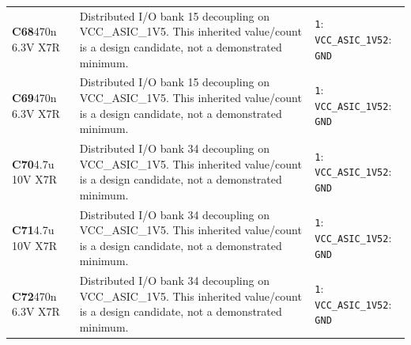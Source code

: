 \documentclass[11pt,a4paper]{article}
\begin{document}
\begin{longtable}{@{}P{27mm}P{84mm}P{57mm}@{}}
\textbf{C68}\newline 470n 6.3V X7R & Distributed I/O bank 15 decoupling on VCC\_ASIC\_1V5. This inherited value/count is a design candidate, not a demonstrated minimum. & \nolinkurl{1}: \nolinkurl{VCC_ASIC_1V5}\newline \nolinkurl{2}: \nolinkurl{GND} \\
\textbf{C69}\newline 470n 6.3V X7R & Distributed I/O bank 15 decoupling on VCC\_ASIC\_1V5. This inherited value/count is a design candidate, not a demonstrated minimum. & \nolinkurl{1}: \nolinkurl{VCC_ASIC_1V5}\newline \nolinkurl{2}: \nolinkurl{GND} \\
\textbf{C70}\newline 4.7u 10V X7R & Distributed I/O bank 34 decoupling on VCC\_ASIC\_1V5. This inherited value/count is a design candidate, not a demonstrated minimum. & \nolinkurl{1}: \nolinkurl{VCC_ASIC_1V5}\newline \nolinkurl{2}: \nolinkurl{GND} \\
\textbf{C71}\newline 4.7u 10V X7R & Distributed I/O bank 34 decoupling on VCC\_ASIC\_1V5. This inherited value/count is a design candidate, not a demonstrated minimum. & \nolinkurl{1}: \nolinkurl{VCC_ASIC_1V5}\newline \nolinkurl{2}: \nolinkurl{GND} \\
\textbf{C72}\newline 470n 6.3V X7R & Distributed I/O bank 34 decoupling on VCC\_ASIC\_1V5. This inherited value/count is a design candidate, not a demonstrated minimum. & \nolinkurl{1}: \nolinkurl{VCC_ASIC_1V5}\newline \nolinkurl{2}: \nolinkurl{GND} \\

\end{longtable}
\end{document}

